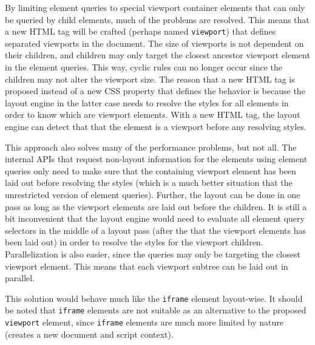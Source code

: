 \documentclass[a4paper,11pt]{kth-mag}
\newcommand{\code}[1]{\texttt{#1}}
\begin{document}
          By limiting element queries to special \gls{viewport} container \glspl{element} that can only be queried by child \glspl{element}, much of the problems are resolved.
          This means that a new \gls{HTML} tag will be crafted (perhaps named \code{viewport}) that defines separated \glspl{viewport} in the document.
          The size of \glspl{viewport} is not dependent on their children, and children may only target the closest ancestor \gls{viewport} \gls{element} in the element queries.
          This way, cyclic rules can no longer occur since the children may not alter the \gls{viewport} size.
          The reason that a new \gls{HTML} tag is proposed instead of a new \gls{CSS} property that defines the behavior is because the \gls{layout engine} in the latter case needs to resolve the styles for all \glspl{element} in order to know which are \gls{viewport} \glspl{element}.
          With a new \gls{HTML} tag, the \gls{layout engine} can detect that that the \gls{element} is a \gls{viewport} before any resolving styles.

          This approach also solves many of the performance problems, but not all.
          The internal \glspl{API} that request non-layout information for the \glspl{element} using element queries only need to make sure that the containing \gls{viewport} \gls{element} has been laid out before resolving the styles (which is a much better situation that the unrestricted version of element queries).
          Further, the layout can be done in one pass as long as the \gls{viewport} \glspl{element} are laid out before the children.
          It is still a bit inconvenient that the \gls{layout engine} would need to evaluate all element query selectors in the middle of a layout pass (after the that the \gls{viewport} \glspl{element} has been laid out) in order to resolve the styles for the \gls{viewport} children.
          Parallelization is also easier, since the queries may only be targeting the closest \gls{viewport} \gls{element}.
          This means that each \gls{viewport} subtree can be laid out in parallel.

          This solution would behave much like the \code{iframe} \gls{element} layout-wise.
          It should be noted that \code{iframe} \glspl{element} are not suitable as an alternative to the proposed \code{viewport} \gls{element}, since \code{iframe} elements are much more limited by nature (creates a new document and script context).
\end{document}
